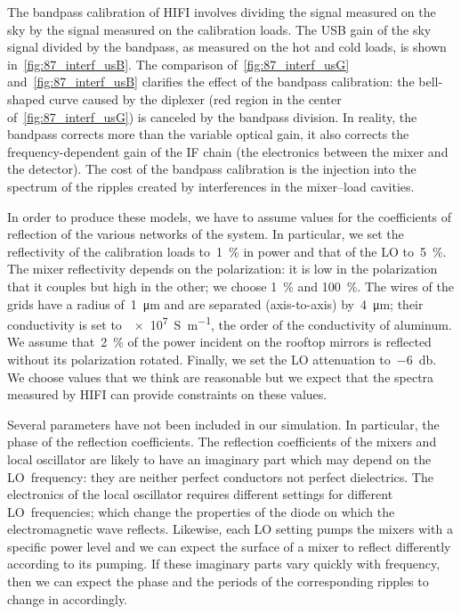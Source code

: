 The bandpass calibration of HIFI involves dividing the signal measured on the sky by the signal measured on the calibration loads.
The USB gain of the sky signal divided by the bandpass, as measured on the hot and cold loads, is shown in~\cref{fig:87_interf_usB}.
The comparison of~\cref{fig:87_interf_usG} and~\cref{fig:87_interf_usB} clarifies the effect of the bandpass calibration: the bell-shaped curve caused by the diplexer (red region in the center of~\cref{fig:87_interf_usG}) is canceled by the bandpass division.
In reality, the bandpass corrects more than the variable optical gain, it also corrects the frequency-dependent gain of the IF chain (the electronics between the mixer and the detector).
The cost of the bandpass calibration is the injection into the spectrum of the ripples created by interferences in the mixer--load cavities.

In order to produce these models, we have to assume values for the coefficients of reflection of the various networks of the system.
In particular, we set the reflectivity of the calibration loads to~\SI{1}{\percent} in power and that of the LO to~\SI{5}{\percent}.
The mixer reflectivity depends on the polarization: it is low in the polarization that it couples but high in the other; we choose \SI{1}{\percent} and \SI{100}{\percent}.
The wires of the grids have a radius of~\SI{1}{\micro\meter} and are separated (axis-to-axis) by~\SI{4}{\micro\meter}; their conductivity is set to~\SI{e7}{\siemens\per\meter}, the order of the conductivity of aluminum.
We assume that~\SI{2}{\percent} of the power incident on the rooftop mirrors is reflected without its polarization rotated.
Finally, we set the LO attenuation to~\SI{-6}{\decibel}.
We choose values that we think are reasonable but we expect that the spectra measured by HIFI can provide constraints on these values.

Several parameters have not been included in our simulation.
In particular, the phase of the reflection coefficients.
The reflection coefficients of the mixers and local oscillator are likely to have an imaginary part which may depend on the LO~frequency: they are neither perfect conductors not perfect dielectrics.
The electronics of the local oscillator requires different settings for different LO~frequencies; which change the properties of the diode on which the electromagnetic wave reflects.
Likewise, each LO setting pumps the mixers with a specific power level and we can expect the surface of a mixer to reflect differently according to its pumping.
If these imaginary parts vary quickly with frequency, then we can expect the phase and the periods of the corresponding ripples to change in accordingly.


